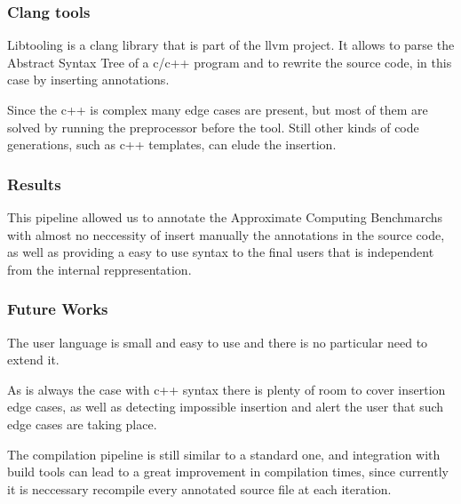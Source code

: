 \documentclass{beamer}
\begin{document}
\begin{frame}[fragile]
	\frametitle{Clang tools}
	\begin{block}{}
		Libtooling is a clang library that is part of the llvm project. It allows to parse the Abstract Syntax Tree of a c/c++ program and to rewrite the source code, in this case by inserting annotations. 
	\end{block}

	\begin{block}{}
		Since the c++ is complex many edge cases are present, but most of them are solved by running the preprocessor before the tool. Still other kinds of code generations, such as c++ templates, can elude the insertion.
	\end{block}
	

\end{frame}
\begin{frame}[fragile]
	\frametitle{Results}
	\begin{block}{}
		This pipeline allowed us to annotate the Approximate Computing Benchmarchs with almost no neccessity of insert manually the annotations in the source code, as well as providing a easy to use syntax to the final users that is independent from the internal reppresentation.
	\end{block}


\end{frame}
\begin{frame}[fragile]
	\frametitle{Future Works}
	\begin{block}{}
		The user language is small and easy to use and there is no particular need to extend it.
	\end{block}
	\begin{block}{}
		As is always the case with c++ syntax there is plenty of room to cover insertion edge cases, as well as detecting impossible insertion and alert the user that such edge cases are taking place.
	\end{block}
	\begin{block}{}
		The compilation pipeline is still similar to a standard one, and integration with build tools can lead to a great improvement in compilation times, since currently it is neccessary recompile every annotated source file at each iteration.
	\end{block}


\end{frame}
\end{document}
